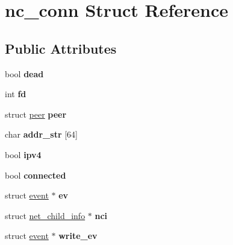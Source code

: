 \hypertarget{structnc__conn}{\section{nc\-\_\-conn Struct Reference}
\label{structnc__conn}
}
\subsection*{Public Attributes}
\begin{DoxyCompactItemize}
\item 
\hypertarget{structnc__conn_a61c30092f6a71cf1cae1b06957f2ff7c}{bool {\bfseries dead}}\label{structnc__conn_a61c30092f6a71cf1cae1b06957f2ff7c}

\item 
\hypertarget{structnc__conn_a9c6f02628cd16c4ad4c46d4529b84a9e}{int {\bfseries fd}}\label{structnc__conn_a9c6f02628cd16c4ad4c46d4529b84a9e}

\item 
\hypertarget{structnc__conn_a0dcf566cd4ac7cc0a3e0ea4abb4d81f6}{struct \hyperlink{structpeer}{peer} {\bfseries peer}}\label{structnc__conn_a0dcf566cd4ac7cc0a3e0ea4abb4d81f6}

\item 
\hypertarget{structnc__conn_a1389e4d7e8975f439cd06ec77e570cfd}{char {\bfseries addr\-\_\-str} \mbox{[}64\mbox{]}}\label{structnc__conn_a1389e4d7e8975f439cd06ec77e570cfd}

\item 
\hypertarget{structnc__conn_acbcc95f4abc3c7c6c6212fa5786c78b1}{bool {\bfseries ipv4}}\label{structnc__conn_acbcc95f4abc3c7c6c6212fa5786c78b1}

\item 
\hypertarget{structnc__conn_a00cdc6dd303fc80ff70ded62d277a1d6}{bool {\bfseries connected}}\label{structnc__conn_a00cdc6dd303fc80ff70ded62d277a1d6}

\item 
\hypertarget{structnc__conn_a9a7e7806d03757baf0a4d777ed4b138b}{struct \hyperlink{structevent}{event} $\ast$ {\bfseries ev}}\label{structnc__conn_a9a7e7806d03757baf0a4d777ed4b138b}

\item 
\hypertarget{structnc__conn_aa577405019128fbb5cbe2eca08b953cb}{struct \hyperlink{structnet__child__info}{net\-\_\-child\-\_\-info} $\ast$ {\bfseries nci}}\label{structnc__conn_aa577405019128fbb5cbe2eca08b953cb}

\item 
\hypertarget{structnc__conn_af789d3bda9d07c1b767db1cf80b24407}{struct \hyperlink{structevent}{event} $\ast$ {\bfseries write\-\_\-ev}}\label{structnc__conn_af789d3bda9d07c1b767db1cf80b24407}


\end{DoxyCompactItemize}
